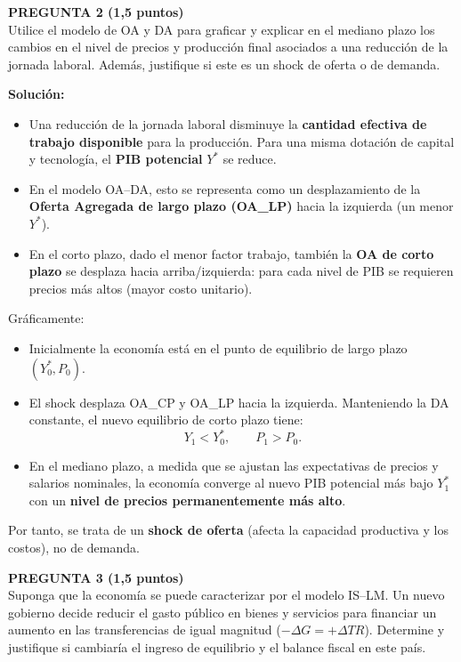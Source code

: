 \documentclass[11pt,addpoints]{article}
\begin{document}
\textbf{PREGUNTA 2 (1,5 puntos)}\\[0.2cm]
Utilice el modelo de OA y DA para graficar y explicar en el mediano plazo los cambios en el nivel de precios y producción final asociados a una reducción de la jornada laboral. Además, justifique si este es un shock de oferta o de demanda.

\vspace{0.2cm}
\textbf{Solución:}
\begin{itemize}
  \item Una reducción de la jornada laboral disminuye la \textbf{cantidad efectiva de trabajo disponible} para la producción. Para una misma dotación de capital y tecnología, el \textbf{PIB potencial} $Y^*$ se reduce.
  \item En el modelo OA--DA, esto se representa como un desplazamiento de la \textbf{Oferta Agregada de largo plazo (OA\_LP)} hacia la izquierda (un menor $Y^*$).
  \item En el corto plazo, dado el menor factor trabajo, también la \textbf{OA de corto plazo} se desplaza hacia arriba/izquierda: para cada nivel de PIB se requieren precios más altos (mayor costo unitario).
\end{itemize}

Gráficamente:
\begin{itemize}
  \item Inicialmente la economía está en el punto de equilibrio de largo plazo $(Y^*_0, P_0)$.
  \item El shock desplaza OA\_CP y OA\_LP hacia la izquierda. Manteniendo la DA constante, el nuevo equilibrio de corto plazo tiene:
  \[
  Y_1 < Y^*_0,\qquad P_1 > P_0.
  \]
  \item En el mediano plazo, a medida que se ajustan las expectativas de precios y salarios nominales, la economía converge al nuevo PIB potencial más bajo $Y^*_1$ con un \textbf{nivel de precios permanentemente más alto}.
\end{itemize}

Por tanto, se trata de un \textbf{shock de oferta} (afecta la capacidad productiva y los costos), no de demanda.

\vspace{0.4cm}

\textbf{PREGUNTA 3 (1,5 puntos)}\\[0.2cm]
Suponga que la economía se puede caracterizar por el modelo IS–LM.  
Un nuevo gobierno decide reducir el gasto público en bienes y servicios para financiar un aumento en las transferencias de igual magnitud ($-\Delta G = +\Delta TR$). Determine y justifique si cambiaría el ingreso de equilibrio y el balance fiscal en este país.
\end{document}
